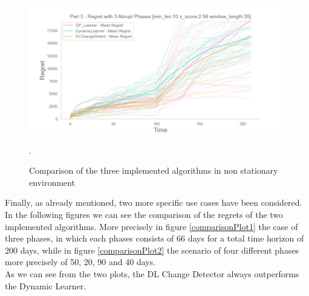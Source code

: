 \begin{figure}[!htb]
	\centering
		\includegraphics[width=\textwidth]{images/CompleteThreeDifferentPhases.jpeg}
	\caption{Comparison of the three implemented algorithms in non stationary environment}.
	\label{regretPart3CompleteFig}
\end{figure}

Finally, as already mentioned, two more specific use cases have been considered. In the following figures we can see the comparison of the regrets of the two implemented algorithms. More precisely in figure \ref{comparisonPlot1} the case of three phases, in which each phases consists of 66 days for a total time horizon of 200 days, while in figure \ref{comparisonPlot2} the scenario of four different phases more precisely of 50, 20, 90 and 40 days.\\ As we can see from the two plots, the DL Change Detector always outperforms the Dynamic Learner.

